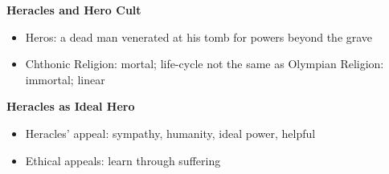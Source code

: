 \documentclass[12pt,a4paper]{report}
\begin{document}
\textbf{Heracles and Hero Cult}
\begin{itemize}
\item Heros: a dead man venerated at his tomb for powers beyond the grave
\item Chthonic Religion: mortal; life-cycle not the same as Olympian Religion: immortal; linear
\end{itemize}

\textbf{Heracles as Ideal Hero}
\begin{itemize}
\item Heracles' appeal: sympathy, humanity, ideal power, helpful
\item Ethical appeals: learn through suffering
\end{itemize}
\end{document}
